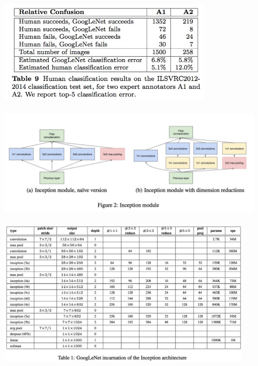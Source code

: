 \documentclass[xetex,mathserif,serif,aspectratio=169]{beamer}
\begin{document}
\begin{frame}[fragile] \frametitle{} \oldB \small

\begin{center}
\includegraphics[width=0.8\textwidth]{img/googLeNetVsHuman.jpg}
\end{center}

\end{frame}

\begin{frame}[fragile] \frametitle{} \oldB \small

\begin{center}
\includegraphics[width=\textwidth]{img/googLeNetInception.jpg}
\end{center}

\end{frame}

\begin{frame}[fragile] \frametitle{} \oldB \small

\begin{center}
\includegraphics[width=0.95\textwidth]{img/googLeNetModel.jpg}
\end{center}

\end{frame}
\end{document}
